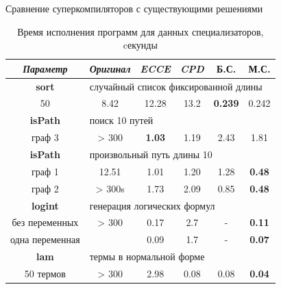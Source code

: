 \documentclass[xcolor=table]{beamer}
\begin{document}
\begin{frame}
    {Сравнение суперкомпиляторов с существующими решениями}
\begin{table}
\center
\begin{tabular}{|c|c|c|c|c|c|}
\hline
{\it Параметр} & {\it Оригинал} & {\it ECCE }  & {\it CPD} & {\bf Б.С.} & {\bf М.С.} \\ \hline
\rowcolor{black!10}
{\bf sort} & \multicolumn{5}{|l|}{случайный список фиксированной длины } \\ \hline
50       & 8.42     & 12.28 & 13.2 & {\bf 0.239} & 0.242 \\ \hline

\rowcolor{black!10}
 {\bf isPath} & \multicolumn{5}{|l|}{поиск 10 путей} \\ \hline
  граф 3      & > 300 & {\bf 1.03} & 1.19 & 2.43 & 1.81 \\ \hline
\rowcolor{black!10}
 {\bf isPath} & \multicolumn{5}{|l|}{произвольный путь длины 10} \\ \hline
 граф 1  &  12.51  & 1.01 & 1.20 & 1.28 &  {\bf 0.48} \\
 граф 2  &  > 300s & 1.73 & 2.09 & 0.85 & {\bf 0.48} \\ 
 \hline

\rowcolor{black!10}
{\bf logint} & \multicolumn{5}{|l|}{генерация логических формул} \\ \hline
без переменных & > 300    & 0.17  & 2.7  & - & {\bf 0.11} \\
одна переменная&          & 0.09  & 1.7  & - & {\bf 0.07} \\
\hline

\rowcolor{black!10}
{\bf lam} & \multicolumn{5}{|l|}{термы в нормальной форме} \\ \hline
50 термов & > 300    & 2.98  & 0.08 & 0.08 & {\bf 0.04}   \\
\hline
\end{tabular}
\caption{Время исполнения программ для данных специализаторов, cекунды}
\label{fig:totalResult}
\end{table}
\end{frame}
\end{document}
